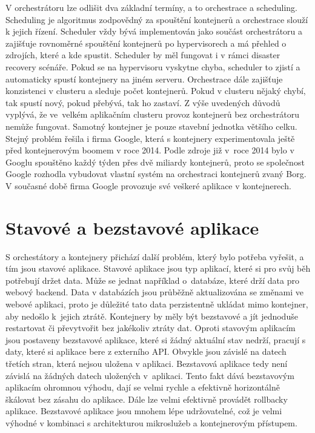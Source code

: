 V orchestrátoru lze odlišit dva základní termíny, a to orchestrace a scheduling. Scheduling je algoritmus zodpovědný za spouštění kontejnerů a orchestrace slouží k jejich řízení. Scheduler vždy bývá implementován jako součást orchestrátoru a zajišťuje rovnoměrné spouštění kontejnerů po hypervisorech a má přehled o zdrojích, které a kde spustit. Scheduler by měl fungovat i v rámci disaster recovery scénáře. Pokud se na hypervisoru vyskytne chyba, scheduler to zjistí a automaticky spustí kontejnery na jiném serveru. Orchestrace dále zajišťuje konzistenci v clusteru a sleduje počet kontejnerů. Pokud v clusteru nějaký chybí, tak spustí nový, pokud přebývá, tak ho zastaví. Z výše uvedených důvodů vyplývá, že ve velkém aplikačním clusteru provoz kontejnerů bez orchestrátoru nemůže fungovat. Samotný kontejner je pouze stavební jednotka většího celku. Stejný problém řešila i firma Google, která s kontejnery experimentovala ještě před kontejnerovým boomem v roce 2014. Podle zdroje \cite{google_container} již v roce 2014 bylo v Googlu spouštěno každý týden přes dvě miliardy kontejnerů, proto se společnost Google rozhodla vybudovat vlastní systém na orchestraci kontejnerů zvaný Borg. V současné době firma Google provozuje své veškeré aplikace v kontejnerech.

\section{Stavové a bezstavové aplikace}
S orchestátory a kontejnery přichází další problém, který bylo potřeba vyřešit, a tím jsou stavové aplikace. Stavové aplikace jsou typ aplikací, které si pro svůj běh potřebují držet data. Může se jednat například o databáze, které drží data pro webový backend. Data v databázích jsou průběžně aktualizována se změnami ve webové aplikaci, proto je důležité tato data perzistentně ukládat mimo kontejner, aby nedošlo k jejich ztrátě. Kontejnery by měly být bezstavové a jít jednoduše restartovat či převytvořit bez jakékoliv ztráty dat. Oproti stavovým aplikacím jsou postaveny bezstavové aplikace, které si žádný aktuální stav nedrží, pracují s daty, které si aplikace bere z externího API. Obvykle jsou závislé na datech třetích stran, která nejsou uložena v aplikaci. Bezstavová aplikace tedy není závislá na žádných datech uložených v aplikaci. Tento fakt dává bezstavovým aplikacím ohromnou výhodu, dají se velmi rychle a efektivně horizontálně škálovat bez zásahu do aplikace. Dále lze velmi efektivně provádět rollbacky aplikace. Bezstavové aplikace jsou mnohem lépe udržovatelné, což je velmi výhodné v kombinaci s architekturou mikroslužeb a kontejnerovým přístupem.

